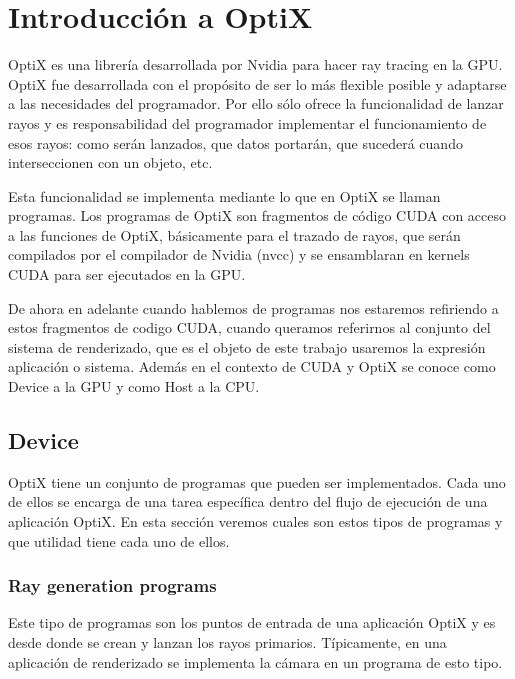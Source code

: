\chapter{Introducción a OptiX}


OptiX es una librería desarrollada por Nvidia para hacer ray tracing en la GPU. OptiX fue desarrollada con el propósito de ser lo más flexible posible y adaptarse a las necesidades del programador. Por ello sólo ofrece la funcionalidad de lanzar rayos y es responsabilidad del programador implementar el funcionamiento de esos rayos: como serán lanzados, que datos portarán, que sucederá cuando interseccionen con un objeto, etc.

\medskip

Esta funcionalidad se implementa mediante lo que en OptiX se llaman programas. Los programas de OptiX son fragmentos de código CUDA con acceso a las funciones de OptiX, básicamente para el trazado de rayos, que serán compilados por el compilador de Nvidia (nvcc) y se ensamblaran en kernels CUDA para ser ejecutados en la GPU. 

\medskip
De ahora en adelante cuando hablemos de programas nos estaremos refiriendo a estos fragmentos de codigo CUDA, cuando queramos referirnos al conjunto del sistema de renderizado, que es el objeto de este trabajo usaremos la expresión aplicación o sistema. Además en el contexto de CUDA y OptiX se conoce como Device a la GPU y como Host a la CPU.

\clearpage

\section{Device}

OptiX tiene un conjunto de programas que pueden ser implementados. Cada uno de ellos se encarga de una tarea específica dentro del flujo de ejecución de una aplicación OptiX. En esta sección veremos cuales son estos tipos de programas y que utilidad tiene cada uno de ellos.  

\subsection{Ray generation programs}

Este tipo de programas son los puntos de entrada de una aplicación OptiX y es desde donde se crean y lanzan los rayos primarios. Típicamente, en una aplicación de renderizado se implementa la cámara en un programa de esto tipo.

